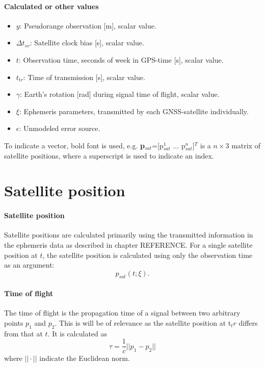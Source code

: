 \documentclass[]{article}
\begin{document}
\paragraph{Calculated or other values}
\begin{itemize}
\item $y$: Pseudorange observation [m], scalar value.
\item $\Delta t_{sv}$: Satellite clock bias [s], scalar value.
\item $t$: Observation time, seconds of week in GPS-time [s], scalar value.
\item $t_{tr}$: Time of transmission [s], scalar value.
\item $\gamma$: Earth's rotation [rad] during signal time of flight, scalar value.
\item $\xi$: Ephemeris parameters, transmitted by each GNSS-satellite individually.
\item $\epsilon$: Unmodeled error source.
\end{itemize}
To indicate a vector, bold font is used, e.g. \textbf{p}$_{sat}$=[p$_{sat}^1$ ... p$_{sat}^n$]$^T$ is a $n\times3$ matrix of satellite positions, where a superscript is used to indicate an index. 
\section{Satellite position}

\paragraph{Satellite position}
Satellite positions are calculated primarily using the transmitted information in the ephemeris data as described in chapter REFERENCE. For a single satellite position at $t$, the satellite position is calculated using only the observation time as an argument:
\begin{equation}\label{eq:p_sat}
 p_{sat}(t; \xi).
\end{equation}
\paragraph{Time of flight}
The time of flight is the propagation time of a signal between two arbitrary points $p_1$ and $p_2$. This is will be of relevance as the satellite position at t$_tr$ differs from that at $t$. It is calculated as
\begin{equation}\label{eq:tof}
\tau=\frac{1}{c}||p_1-p_2||
\end{equation}
where $||\cdot||$ indicate the Euclidean norm.
\end{document}
